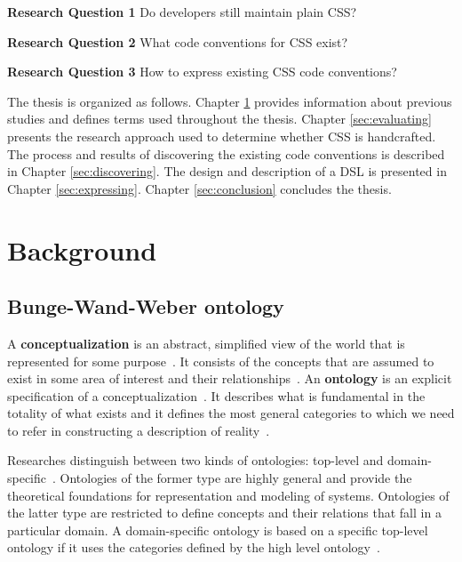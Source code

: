 \documentclass[parskip=full]{uvamscse}
\begin{document}
  \begin{description}
    \item \textbf{Research Question 1} Do developers still maintain plain CSS?
    \item \textbf{Research Question 2} What code conventions for CSS exist?
    \item \textbf{Research Question 3} How to express existing CSS code conventions?
  \end{description}

The thesis is organized as follows. Chapter \ref{sec:background} provides information about previous
studies and defines terms used throughout the thesis. Chapter \ref{sec:evaluating} presents the
research approach used to determine whether CSS is handcrafted. The process and results of
discovering the existing code conventions is described in Chapter \ref{sec:discovering}. The design
and description of a DSL is presented in Chapter \ref{sec:expressing}. Chapter \ref{sec:conclusion}
concludes the thesis.


\chapter{Background}
\label{sec:background}

\section{Bunge-Wand-Weber ontology}

A \textbf{conceptualization} is an abstract, simplified view of the world that is represented for
some purpose~\cite{gruber1995toward}. It consists of the concepts that are assumed to exist in some
area of interest and their relationships~\cite{gruber1995toward}. An \textbf{ontology} is an
explicit specification of a conceptualization~\cite{gruber1995toward}. It describes what is
fundamental in the totality of what exists and it defines the most general categories to which we
need to refer in constructing a description of reality~\cite{milton2004top}.

Researches distinguish between two kinds of ontologies: top-level and domain-
specific~\cite{milton2004top}. Ontologies of the former type are highly general and provide the
theoretical foundations for representation and modeling of systems. Ontologies of the latter type
are restricted to define concepts and their relations that fall in a particular domain. A domain-specific ontology is based on a specific top-level ontology if it uses the categories defined by the high level ontology~\cite{milton2004top}.
\end{document}

